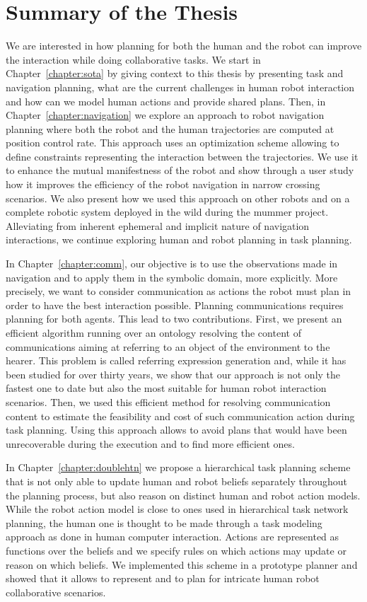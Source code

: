 \documentclass[a4paper,11pt,twoside]{StyleThese}
\begin{document}
\section*{Summary of the Thesis}
We are interested in how planning for both the human and the robot can improve the interaction while doing collaborative tasks. We start in Chapter~\ref{chapter:sota} by giving context to this thesis by presenting task and navigation planning, what are the current challenges in human robot interaction and how can we model human actions and provide shared plans. Then, in Chapter~\ref{chapter:navigation} we explore an approach to robot navigation planning where both the robot and the human trajectories are computed at position control rate. This approach uses an optimization scheme allowing to define constraints representing the interaction between the trajectories. We use it to enhance the mutual manifestness of the robot and show through a user study how it improves the efficiency of the robot navigation in narrow crossing scenarios. We also present how we used this approach on other robots and on a complete robotic system deployed in the wild during the \acrfull{mummer} project. Alleviating from inherent ephemeral and implicit nature of navigation interactions, we continue exploring human and robot planning in task planning.

In Chapter~\ref{chapter:comm}, our objective is to use the observations made in navigation and to apply them in the symbolic domain, more explicitly. More precisely, we want to consider communication as actions the robot must plan in order to have the best interaction possible. Planning communications requires planning for both agents. This lead to two contributions. First, we present an efficient algorithm running over an ontology resolving the content of communications aiming at referring to an object of the environment to the hearer. This problem is called referring expression generation and, while it has been studied for over thirty years, we show that our approach is not only the fastest one to date but also the most suitable for human robot interaction scenarios. Then, we used this efficient method for resolving communication content to estimate the feasibility and cost of such communication action during task planning. Using this approach allows to avoid plans that would have been unrecoverable during the execution and to find more efficient ones.

In Chapter~\ref{chapter:doublehtn} we propose a hierarchical task planning scheme that is not only able to update human and robot beliefs separately throughout the planning process, but also reason on distinct human and robot action models. While the robot action model is close to ones used in hierarchical task network planning, the human one is thought to be made through a task modeling approach as done in human computer interaction. Actions are represented as functions over the beliefs and we specify rules on which actions may update or reason on which beliefs. We implemented this scheme in a prototype planner and showed that it allows to represent and to plan for intricate human robot collaborative scenarios. 
\end{document}
